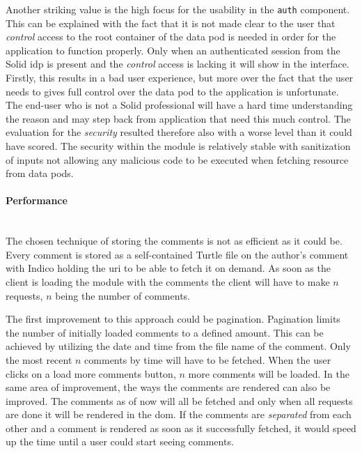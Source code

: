 Another striking value is the high focus for the usability in the \texttt{auth} component. This can be explained with the fact that it is not made clear to the user that \textit{control} access to the root container of the data pod is needed in order for the application to function properly. Only when an authenticated session from the Solid \gls{idp} is present and the \textit{control} access is lacking it will show in the interface. Firstly, this results in a bad user experience, but more over the fact that the user needs to gives full control over the data pod to the application is unfortunate. The end-user who is not a Solid professional will have a hard time understanding the reason and may step back from application that need this much control. The evaluation for the \textit{security} resulted therefore also with a worse level than it could have scored. The security within the module is relatively stable with sanitization of inputs not allowing any malicious code to be executed when fetching resource from data pods.

\vspace{0.5cm}
\paragraph{Performance}\label{paragraph:evaluation-performance}\mbox{}\\

The chosen technique of storing the comments is not as efficient as it could be. Every comment is stored as a self-contained Turtle file on the author's comment with Indico holding the \gls{uri} to be able to fetch it on demand. As soon as the client is loading the module with the comments the client will have to make $n$ requests, $n$ being the number of comments.

The first improvement to this approach could be pagination. Pagination limits the number of initially loaded comments to a defined amount. This can be achieved by utilizing the date and time from the file name of the comment. Only the most recent $n$ comments by time will have to be fetched. When the user clicks on a load more comments button, $n$ more comments will be loaded.
In the same area of improvement, the ways the comments are rendered can also be improved. The comments as of now will all be fetched and only when all requests are done it will be rendered in the \gls{dom}. If the comments are \textit{separated} from each other and a comment is rendered as soon as it successfully fetched, it would speed up the time until a user could start seeing comments.

